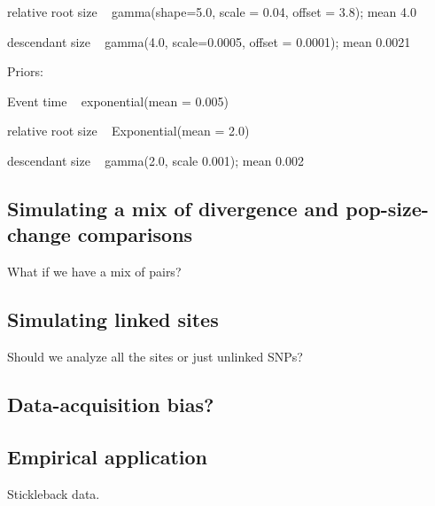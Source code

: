 relative root size ~ gamma(shape=5.0, scale = 0.04, offset = 3.8); mean 4.0

descendant size ~ gamma(4.0, scale=0.0005, offset = 0.0001); mean 0.0021

Priors:

Event time ~ exponential(mean = 0.005)

relative root size ~ Exponential(mean = 2.0)

descendant size ~ gamma(2.0, scale 0.001); mean 0.002


\subsection{Simulating a mix of divergence and pop-size-change comparisons}
What if we have a mix of pairs?


\subsection{Simulating linked sites}
Should we analyze all the sites or just unlinked SNPs?


\subsection{Data-acquisition bias?}


\subsection{Empirical application}
Stickleback data.



